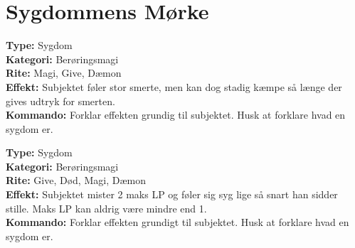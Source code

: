 
\section{Sygdommens Mørke}

\begin{sygdom*}[Forrådnelse]
\textbf{Type:} Sygdom\\
\textbf{Kategori:} Berøringsmagi\\
\textbf{Rite:} Magi, Give, Dæmon\\
\textbf{Effekt:} Subjektet føler stor smerte, men kan dog stadig kæmpe så længe der gives udtryk for smerten.\\
\textbf{Kommando:} Forklar effekten grundig til subjektet. Husk at forklare hvad en sygdom er.
\end{sygdom*}

\begin{sygdom*}[Feber]
\textbf{Type:} Sygdom\\
\textbf{Kategori:} Berøringsmagi\\
\textbf{Rite:} Give, Død, Magi, Dæmon\\
\textbf{Effekt:} Subjektet mister 2 maks LP og føler sig syg lige så snart han sidder stille. Maks LP kan aldrig være mindre end 1.\\
\textbf{Kommando:} Forklar effekten grundigt til subjektet. Husk at forklare hvad en sygdom er.
\end{sygdom*}

